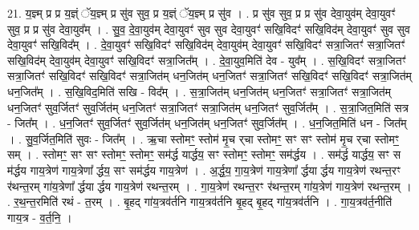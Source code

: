 \documentclass[17pt]{extarticle}
\begin{document}
21. य॒ज्ञ्म् प्र प्र य॒ज्ञ्ं ॅय॒ज्ञ्म् प्र सु॑व सुव॒ प्र य॒ज्ञ्ं ॅय॒ज्ञ्म् प्र सु॑व । . प्र सु॑व सुव॒ प्र प्र सु॑व देवा॒युव॑म् देवा॒युवꣳ॑ सुव॒ प्र प्र सु॑व देवा॒युव᳚म् । . सु॒व॒ दे॒वा॒युव॑म् देवा॒युवꣳ॑ सुव सुव देवा॒युवꣳ॑ सखि॒विदꣳ॑ सखि॒विद॑म् देवा॒युवꣳ॑ सुव सुव देवा॒युवꣳ॑ सखि॒विद᳚म् । . दे॒वा॒युवꣳ॑ सखि॒विदꣳ॑ सखि॒विद॑म् देवा॒युव॑म् देवा॒युवꣳ॑ सखि॒विदꣳ॑ सत्रा॒जितꣳ॑ सत्रा॒जितꣳ॑ सखि॒विद॑म् देवा॒युव॑म् देवा॒युवꣳ॑ सखि॒विदꣳ॑ सत्रा॒जित᳚म् । . दे॒वा॒युव॒मिति॑ देव - युव᳚म् । . स॒खि॒विदꣳ॑ सत्रा॒जितꣳ॑ सत्रा॒जितꣳ॑ सखि॒विदꣳ॑ सखि॒विदꣳ॑ सत्रा॒जित॑म् धन॒जित॑म् धन॒जितꣳ॑ सत्रा॒जितꣳ॑ सखि॒विदꣳ॑ सखि॒विदꣳ॑ सत्रा॒जित॑म् धन॒जित᳚म् । . स॒खि॒विद॒मिति॑ सखि - विद᳚म् । . स॒त्रा॒जित॑म् धन॒जित॑म् धन॒जितꣳ॑ सत्रा॒जितꣳ॑ सत्रा॒जित॑म् धन॒जितꣳ॑ सुव॒र्जितꣳ॑ सुव॒र्जित॑म् धन॒जितꣳ॑ सत्रा॒जितꣳ॑ सत्रा॒जित॑म् धन॒जितꣳ॑ सुव॒र्जित᳚म् । . स॒त्रा॒जित॒मिति॑ सत्र - जित᳚म् । . ध॒न॒जितꣳ॑ सुव॒र्जितꣳ॑ सुव॒र्जित॑म् धन॒जित॑म् धन॒जितꣳ॑ सुव॒र्जित᳚म् । . ध॒न॒जित॒मिति॑ धन - जित᳚म् । . सु॒व॒र्जित॒मिति॑ सुवः - जित᳚म् । . ऋ॒चा स्तोमꣳ॒॒ स्तोम॑ मृ॒च र्‌चा स्तोमꣳ॒॒ सꣳ सꣳ स्तोम॑ मृ॒च र्‌चा 
स्तोमꣳ॒॒ सम् । . स्तोमꣳ॒॒ सꣳ सꣳ स्तोमꣳ॒॒ स्तोमꣳ॒॒ सम॑र्द्ध यार्द्धय॒ सꣳ स्तोमꣳ॒॒ स्तोमꣳ॒॒ सम॑र्द्धय । . सम॑र्द्ध यार्द्धय॒ सꣳ स म॑र्द्धय गाय॒त्रेण॑ गाय॒त्रेणा᳚ र्द्धय॒ सꣳ सम॑र्द्धय गाय॒त्रेण॑ । . अ॒र्द्ध॒य॒ गा॒य॒त्रेण॑ गाय॒त्रेणा᳚ र्द्धया र्द्धय गाय॒त्रेण॑ रथन्त॒रꣳ र॑थन्त॒रम् गा॑य॒त्रेणा᳚ र्द्धया र्द्धय गाय॒त्रेण॑ रथन्त॒रम् । . गा॒य॒त्रेण॑ रथन्त॒रꣳ र॑थन्त॒रम् गा॑य॒त्रेण॑ गाय॒त्रेण॑ रथन्त॒रम् । . र॒थ॒न्त॒रमिति॑ रथं - त॒रम् । . बृ॒हद् गा॑य॒त्रव॑र्तनि गाय॒त्रव॑र्तनि बृ॒हद् बृ॒हद् गा॑य॒त्रव॑र्तनि । . गा॒य॒त्रव॑र्त॒नीति॑ गाय॒त्र - व॒र्त॒नि॒ । \newline
\end{document}
